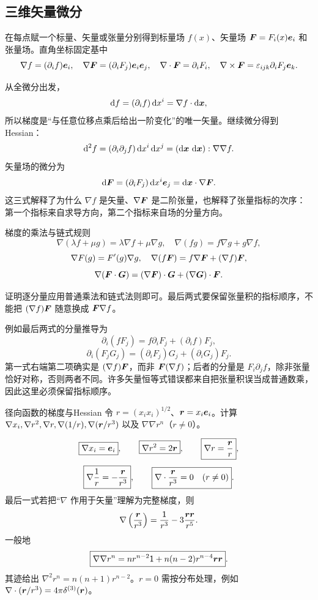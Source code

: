 \subsection{三维矢量微分}

在每点赋一个标量、矢量或张量分别得到标量场 $f(x)$、矢量场
$\bm{F}=F_i(x)\bm{e}_i$ 和张量场。直角坐标固定基中
\[
 \nabla f=(\partial_i f)\bm{e}_i,
 \quad
 \nabla\bm{F}=(\partial_iF_j)\bm{e}_i\bm{e}_j,
 \quad
 \nabla\cdot\bm{F}=\partial_iF_i,
 \quad
 \nabla\times\bm{F}=\varepsilon_{ijk}\partial_iF_j\bm{e}_k.
\]

从全微分出发，
\[
 \mathop{}\!\mathrm d f=(\partial_if)\mathop{}\!\mathrm d x^i=\nabla f\cdot\mathop{}\!\mathrm d\bm{x},
\]
所以梯度是“与任意位移点乘后给出一阶变化”的唯一矢量。继续微分得到 Hessian：
\[
 \mathop{}\!\mathrm d^2f=(\partial_i\partial_jf)\mathop{}\!\mathrm d x^i\mathop{}\!\mathrm d x^j
 =(\mathop{}\!\mathrm d\bm{x}\,\mathop{}\!\mathrm d\bm{x}):\nabla\nabla f.
\]
矢量场的微分为
\[
 \mathop{}\!\mathrm d\bm{F}=(\partial_iF_j)\mathop{}\!\mathrm d x^i\bm{e}_j
 =\mathop{}\!\mathrm d\bm{x}\cdot\nabla\bm{F}.
\]
这三式解释了为什么 $\nabla f$ 是矢量、$\nabla\bm{F}$ 是二阶张量，也解释了张量指标的次序：第一个指标来自求导方向，第二个指标来自场的分量方向。

\begin{advtheorem}{梯度的乘法与链式规则}\label{advA3:thm:gradient-rules}
\[
 \nabla(\lambda f+\mu g)=\lambda\nabla f+\mu\nabla g,
 \quad \nabla(fg)=f\nabla g+g\nabla f,
\]
\[
 \nabla F(g)=F'(g)\nabla g,
 \quad
 \nabla(f\bm{F})=f\nabla\bm{F}+(\nabla f)\bm{F},
\]
\[
 \nabla(\bm{F}\cdot\bm{G})
 =(\nabla\bm{F})\cdot\bm{G}+(\nabla\bm{G})\cdot\bm{F}.
\]
\end{advtheorem}
证明逐分量应用普通乘法和链式法则即可。最后两式要保留张量积的指标顺序，不能把 $(\nabla f)\bm{F}$ 随意换成 $\bm{F}\nabla f$。

例如最后两式的分量推导为
\[
 \partial_i(fF_j)=f\partial_iF_j+(\partial_if)F_j,
\]
\[
 \partial_i(F_jG_j)=(\partial_iF_j)G_j+(\partial_iG_j)F_j.
\]
第一式右端第二项确实是 $(\nabla f)\bm{F}$，而非 $\bm{F}(\nabla f)$；后者的分量是 $F_i\partial_jf$，除非张量恰好对称，否则两者不同。许多矢量恒等式错误都来自把张量积误当成普通数乘，因此这里必须保留指标顺序。

\begin{advexamplebox}{径向函数的梯度与Hessian}\label{advA3:ex:radial-gradients}
令 $r=(x_ix_i)^{1/2}$、$\bm{r}=x_i\bm{e}_i$。计算
$\nabla x_i,\nabla r^2,\nabla r,\nabla(1/r),\nabla(\bm{r}/r^3)$ 以及 $\nabla\nabla r^n$（$r\ne0$）。

\AQRadialHessian
\end{advexamplebox}
\begin{advsolution}
\AARadialHessian

\[
 \boxed{\nabla x_i=\bm{e}_i},\qquad
 \boxed{\nabla r^2=2\bm{r}},\qquad
 \boxed{\nabla r=\frac{\bm{r}}{r}},
\]
\[
 \boxed{\nabla\frac1r=-\frac{\bm{r}}{r^3}},
 \qquad
 \boxed{\nabla\cdot\frac{\bm{r}}{r^3}=0\quad(r\ne0)}.
\]
最后一式若把“$\nabla$ 作用于矢量”理解为完整梯度，则
\[
 \nabla\left(\frac{\bm{r}}{r^3}\right)
 =\frac{\mathsf1}{r^3}-3\frac{\bm{r}\bm{r}}{r^5}.
\]
一般地
\[
 \boxed{\nabla\nabla r^n
 =nr^{n-2}\mathsf1+n(n-2)r^{n-4}\bm{r}\bm{r}}.
\]
其迹给出 $\nabla^2r^n=n(n+1)r^{n-2}$。$r=0$ 需按分布处理，例如
$\nabla\cdot(\bm{r}/r^3)=4\pi\delta^{(3)}(\bm{r})$。
\end{advsolution}

